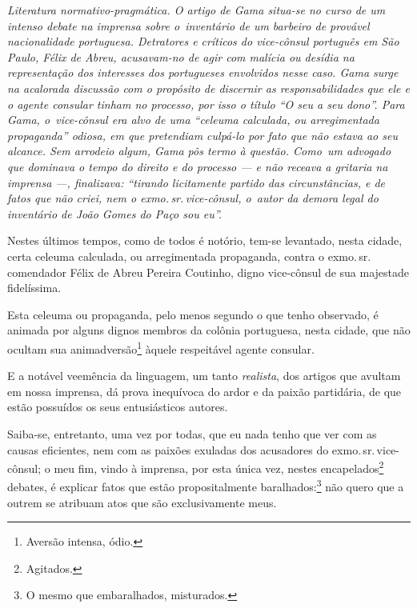 {

\begin{resumo}
\emph{Literatura normativo-pragmática. O artigo de Gama situa-se no
curso de um intenso debate na imprensa sobre o~inventário de um barbeiro
de provável nacionalidade portuguesa. Detratores e críticos do
vice-cônsul português em São Paulo, Félix de Abreu, acusavam-no de agir
com malícia ou desídia na representação dos interesses dos portugueses
envolvidos nesse caso. Gama surge na acalorada discussão com o propósito
de discernir as responsabilidades que ele e o agente consular tinham no
processo, por isso o título ``O seu a seu dono''. Para Gama, o~vice-cônsul era alvo de uma ``celeuma calculada, ou arregimentada
propaganda'' odiosa, em que pretendiam culpá-lo por fato que não estava
ao seu alcance. Sem arrodeio algum, Gama pôs termo à questão. Como~um
advogado que dominava o tempo do direito e do processo --- e não receava
a gritaria na imprensa ---, finalizava: ``tirando licitamente partido das
circunstâncias, e de fatos que não criei, nem o exmo.\,sr.\,vice-cônsul, o~autor da demora legal do inventário de João Gomes do Paço sou eu''. }
\end{resumo}

Nestes últimos tempos, como de todos é notório, tem-se levantado, nesta
cidade, certa celeuma calculada, ou arregimentada propaganda, contra o
exmo.\,sr.\,comendador Félix de Abreu Pereira Coutinho, digno vice-cônsul
de sua majestade fidelíssima.

Esta celeuma ou propaganda, pelo menos segundo o que tenho observado, é
animada por alguns dignos membros da colônia portuguesa, nesta cidade,
que não ocultam sua animadversão\footnote{Aversão intensa, ódio.}
àquele respeitável agente consular.

E a notável veemência da linguagem, um tanto \emph{realista}, dos
artigos que avultam em nossa imprensa, dá prova inequívoca do ardor e da
paixão partidária, de que estão possuídos os seus entusiásticos autores.

Saiba-se, entretanto, uma vez por todas, que eu nada tenho que ver com
as causas eficientes, nem com as paixões exuladas dos acusadores do
exmo.\,sr.\,vice-cônsul; o meu fim, vindo à imprensa, por esta única vez,
nestes encapelados\footnote{Agitados.} debates, é explicar fatos que
estão propositalmente baralhados:\footnote{O mesmo que embaralhados,
  misturados.} não quero que a outrem se atribuam atos que são
exclusivamente meus.

}
